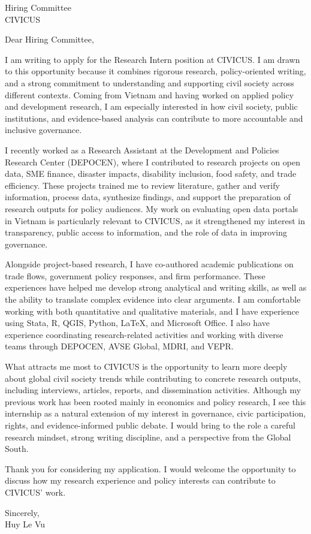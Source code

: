 \documentclass[11pt]{letter}
\date{May 11, 2026}
\begin{document}
\begin{letter}{Hiring Committee\\CIVICUS}

\opening{Dear Hiring Committee,}

I am writing to apply for the Research Intern position at CIVICUS. I am drawn to this opportunity because it combines rigorous research, policy-oriented writing, and a strong commitment to understanding and supporting civil society across different contexts. Coming from Vietnam and having worked on applied policy and development research, I am especially interested in how civil society, public institutions, and evidence-based analysis can contribute to more accountable and inclusive governance.

I recently worked as a Research Assistant at the Development and Policies Research Center (DEPOCEN), where I contributed to research projects on open data, SME finance, disaster impacts, disability inclusion, food safety, and trade efficiency. These projects trained me to review literature, gather and verify information, process data, synthesize findings, and support the preparation of research outputs for policy audiences. My work on evaluating open data portals in Vietnam is particularly relevant to CIVICUS, as it strengthened my interest in transparency, public access to information, and the role of data in improving governance.

Alongside project-based research, I have co-authored academic publications on trade flows, government policy responses, and firm performance. These experiences have helped me develop strong analytical and writing skills, as well as the ability to translate complex evidence into clear arguments. I am comfortable working with both quantitative and qualitative materials, and I have experience using Stata, R, QGIS, Python, \LaTeX, and Microsoft Office. I also have experience coordinating research-related activities and working with diverse teams through DEPOCEN, AVSE Global, MDRI, and VEPR.

What attracts me most to CIVICUS is the opportunity to learn more deeply about global civil society trends while contributing to concrete research outputs, including interviews, articles, reports, and dissemination activities. Although my previous work has been rooted mainly in economics and policy research, I see this internship as a natural extension of my interest in governance, civic participation, rights, and evidence-informed public debate. I would bring to the role a careful research mindset, strong writing discipline, and a perspective from the Global South.

Thank you for considering my application. I would welcome the opportunity to discuss how my research experience and policy interests can contribute to CIVICUS' work.

\vspace{0.75em}
\begin{flushright}
Sincerely,\\[2em]
Huy Le Vu
\end{flushright}

\end{letter}
\end{document}
